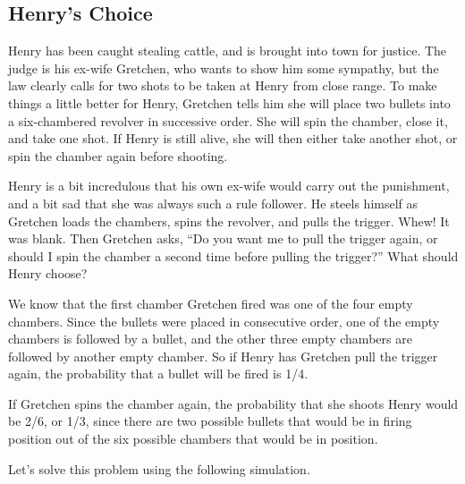 \subsection{Henry's Choice}

\begin{example}
Henry has been caught stealing cattle, and is brought into town for justice. The
judge is his ex-wife Gretchen, who wants to show him some sympathy, but the law
clearly calls for two shots to be taken at Henry from close range. To make
things a little better for Henry, Gretchen tells him she will place two bullets
into a six-chambered revolver in successive order. She will spin the chamber,
close it, and take one shot. If Henry is still alive, she will then either take
another shot, or spin the chamber again before shooting.

Henry is a bit incredulous that his own ex-wife would carry out the punishment,
and a bit sad that she was always such a rule follower. He steels himself as
Gretchen loads the chambers, spins the revolver, and pulls the trigger. Whew! It
was blank. Then Gretchen asks, ``Do you want me to pull the trigger again, or
should I spin the chamber a second time before pulling the trigger?'' What
should Henry choose?
\end{example}

We know that the first chamber Gretchen fired was one of the four empty
chambers. Since the bullets were placed in consecutive order, one of the empty
chambers is followed by a bullet, and the other three empty chambers are
followed by another empty chamber. So if Henry has Gretchen pull the trigger
again, the probability that a bullet will be fired is 1/4.

If Gretchen spins the chamber again, the probability that she shoots Henry would
be 2/6, or 1/3, since there are two possible bullets that would be in firing
position out of the six possible chambers that would be in position.

Let's solve this problem using the following simulation.


